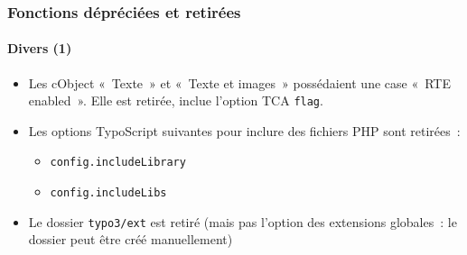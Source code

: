 \begin{frame}[fragile]
	\frametitle{Fonctions dépréciées et retirées}
	\framesubtitle{Divers (1)}

	\begin{itemize}

		\item Les cObject «~Texte~» et «~Texte et images~» possédaient une case «~RTE enabled~».
			Elle est retirée, inclue l'option TCA \texttt{flag}.

		\item Les options TypoScript suivantes pour inclure des fichiers PHP sont retirées~:

			\begin{itemize}
				\item \texttt{config.includeLibrary}
				\item \texttt{config.includeLibs}
			\end{itemize}

		\item Le dossier \texttt{typo3/ext} est retiré\newline
			\small
				(mais pas l'option des extensions globales~: le dossier peut être créé manuellement)
			\normalsize

	\end{itemize}

\end{frame}


